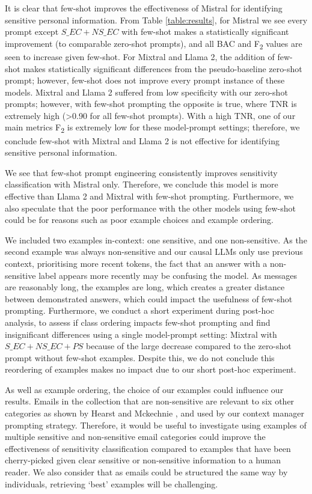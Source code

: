 It is clear that few-shot improves the effectiveness of Mistral for identifying sensitive personal information. From Table \ref{table:results}, for Mistral we see every prompt except $S\_EC+NS\_EC$ with few-shot makes a statistically significant improvement (to comparable zero-shot prompts), and all BAC and F\textsubscript{2} values are seen to increase given few-shot. For Mixtral and Llama 2, the addition of few-shot makes statistically significant differences from the pseudo-baseline zero-shot prompt; however, few-shot does not improve every prompt instance of these models. Mixtral and Llama 2 suffered from low specificity with our zero-shot prompts; however, with few-shot prompting the opposite is true, where TNR is extremely high (>0.90 for all few-shot prompts). With a high TNR, one of our main metrics F\textsubscript{2} is extremely low for these model-prompt settings; therefore, we conclude few-shot with Mixtral and Llama 2 is not effective for identifying sensitive personal information.

We see that few-shot prompt engineering consistently improves sensitivity classification with Mistral only. Therefore, we conclude this model is more effective than Llama 2 and Mixtral with few-shot prompting. Furthermore, we also speculate that the poor performance with the other models using few-shot could be for reasons such as poor example choices and example ordering.

We included two examples in-context: one sensitive, and one non-sensitive. As the second example was always non-sensitive and our causal LLMs only use previous context, prioritising more recent tokens, the fact that an answer with a non-sensitive label appears more recently may be confusing the model. As messages are reasonably long, the examples are long, which creates a greater distance between demonstrated answers, which could impact the usefulness of few-shot prompting. Furthermore, we conduct a short experiment during post-hoc analysis, to assess if class ordering impacts few-shot prompting and find insignificant differences using a single model-prompt setting: Mixtral with $S\_EC+NS\_EC+PS$ because of the large decrease compared to the zero-shot prompt without few-shot examples. Despite this, we do not conclude this reordering of examples makes no impact due to our short post-hoc experiment.

As well as example ordering, the choice of our examples could influence our results. Emails in the collection that are non-sensitive are relevant to six other categories as shown by Hearst \cite{hearst2005teaching} and Mckechnie \cite{mckechnie2024sara}, and used by our context manager prompting strategy. Therefore, it would be useful to investigate using examples of multiple sensitive and non-sensitive email categories could improve the effectiveness of sensitivity classification compared to examples that have been cherry-picked given clear sensitive or non-sensitive information to a human reader. We also consider that as emails could be structured the same way by individuals, retrieving ‘best’ examples will be challenging. 


